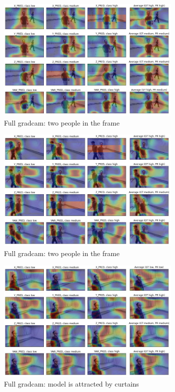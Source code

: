 \begin{figure}[!h]
	\centering
	\includegraphics[width=0.8\textwidth]{"contents/images/gradcam/apx-gradcam-1"}
	\caption[Full \gls{gradcam}: two people in the frame]{Full \gls{gradcam}: two people in the frame}
	\label{fig:apx-gradcam-1}
\end{figure}

\begin{figure}[!h]
\centering
\includegraphics[width=0.8\textwidth]{"contents/images/gradcam/apx-gradcam-2"}
\caption[]{Full \gls{gradcam}: two people in the frame}
\label{fig:apx-gradcam-2}
\end{figure}

\begin{figure}[!h]
\centering
\includegraphics[width=0.8\textwidth]{"contents/images/gradcam/apx-gradcam-3"}
\caption[Full \gls{gradcam}: model is attracted by curtains]{Full \gls{gradcam}: model is attracted by curtains}
\label{fig:apx-gradcam-3}
\end{figure}

